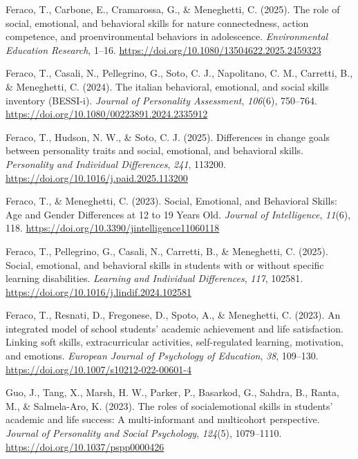 \documentclass[
  man,
  longtable,
  nolmodern,
  notxfonts,
  notimes,
  colorlinks=true,linkcolor=blue,citecolor=blue,urlcolor=blue]{apa7}
\newlength{\cslhangindent}
\newenvironment{CSLReferences}[2] %
 {\begin{list}{}{%
  \setlength{\itemindent}{0pt}
  \setlength{\leftmargin}{0pt}
  \setlength{\parsep}{0pt}
  \ifodd #1
   \setlength{\leftmargin}{\cslhangindent}
   \setlength{\itemindent}{-1\cslhangindent}
  \fi
  \setlength{\itemsep}{#2\baselineskip}}}
 {\end{list}}
\begin{document}
\begin{CSLReferences}{1}{0}
Feraco, T., Carbone, E., Cramarossa, G., \& Meneghetti, C. (2025). The
role of social, emotional, and behavioral skills for nature
connectedness, action competence, and proenvironmental behaviors in
adolescence. \emph{Environmental Education Research}, 1--16.
\url{https://doi.org/10.1080/13504622.2025.2459323}

Feraco, T., Casali, N., Pellegrino, G., Soto, C. J., Napolitano, C. M.,
Carretti, B., \& Meneghetti, C. (2024). The italian behavioral,
emotional, and social skills inventory (BESSI-i). \emph{Journal of
Personality Assessment}, \emph{106}(6), 750--764.
\url{https://doi.org/10.1080/00223891.2024.2335912}

Feraco, T., Hudson, N. W., \& Soto, C. J. (2025). Differences in change
goals between personality traits and social, emotional, and behavioral
skills. \emph{Personality and Individual Differences}, \emph{241},
113200. \url{https://doi.org/10.1016/j.paid.2025.113200}

Feraco, T., \& Meneghetti, C. (2023). Social, Emotional, and Behavioral
Skills: Age and Gender Differences at 12 to 19 Years Old. \emph{Journal
of Intelligence}, \emph{11}(6), 118.
\url{https://doi.org/10.3390/jintelligence11060118}

Feraco, T., Pellegrino, G., Casali, N., Carretti, B., \& Meneghetti, C.
(2025). Social, emotional, and behavioral skills in students with or
without specific learning disabilities. \emph{Learning and Individual
Differences}, \emph{117}, 102581.
\url{https://doi.org/10.1016/j.lindif.2024.102581}

Feraco, T., Resnati, D., Fregonese, D., Spoto, A., \& Meneghetti, C.
(2023). An integrated model of school students{'} academic achievement
and life satisfaction. Linking soft skills, extracurricular activities,
self-regulated learning, motivation, and emotions. \emph{European
Journal of Psychology of Education}, \emph{38}, 109--130.
\url{https://doi.org/10.1007/s10212-022-00601-4}

Guo, J., Tang, X., Marsh, H. W., Parker, P., Basarkod, G., Sahdra, B.,
Ranta, M., \& Salmela-Aro, K. (2023). The roles of
social{\textendash}emotional skills in students{'} academic and life
success: A multi-informant and multicohort perspective. \emph{Journal of
Personality and Social Psychology}, \emph{124}(5), 1079--1110.
\url{https://doi.org/10.1037/pspp0000426}


\end{CSLReferences}
\end{document}
